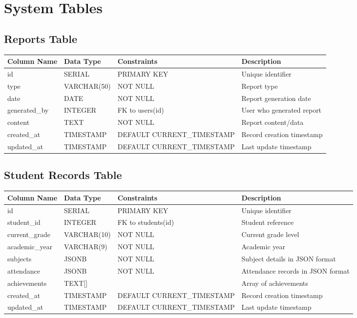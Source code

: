 \documentclass[11pt,a4paper]{article}
\begin{document}
\section{System Tables}

\subsection{Reports Table}
\begin{longtable}{|p{3.5cm}|p{2.5cm}|p{3cm}|p{5.5cm}|}
\hline
\textbf{Column Name} & \textbf{Data Type} & \textbf{Constraints} & \textbf{Description} \\
\hline
\endhead
id & SERIAL & PRIMARY KEY & Unique identifier \\
\hline
type & VARCHAR(50) & NOT NULL & Report type \\
\hline
date & DATE & NOT NULL & Report generation date \\
\hline
generated\_by & INTEGER & FK to users(id) & User who generated report \\
\hline
content & TEXT & NOT NULL & Report content/data \\
\hline
created\_at & TIMESTAMP & DEFAULT CURRENT\_TIMESTAMP & Record creation timestamp \\
\hline
updated\_at & TIMESTAMP & DEFAULT CURRENT\_TIMESTAMP & Last update timestamp \\
\hline
\end{longtable}

\subsection{Student Records Table}
\begin{longtable}{|p{3.5cm}|p{2.5cm}|p{3cm}|p{5.5cm}|}
\hline
\textbf{Column Name} & \textbf{Data Type} & \textbf{Constraints} & \textbf{Description} \\
\hline
\endhead
id & SERIAL & PRIMARY KEY & Unique identifier \\
\hline
student\_id & INTEGER & FK to students(id) & Student reference \\
\hline
current\_grade & VARCHAR(10) & NOT NULL & Current grade level \\
\hline
academic\_year & VARCHAR(9) & NOT NULL & Academic year \\
\hline
subjects & JSONB & NOT NULL & Subject details in JSON format \\
\hline
attendance & JSONB & NOT NULL & Attendance records in JSON format \\
\hline
achievements & TEXT[] & & Array of achievements \\
\hline
created\_at & TIMESTAMP & DEFAULT CURRENT\_TIMESTAMP & Record creation timestamp \\
\hline
updated\_at & TIMESTAMP & DEFAULT CURRENT\_TIMESTAMP & Last update timestamp \\
\hline
\end{longtable}
\end{document}
